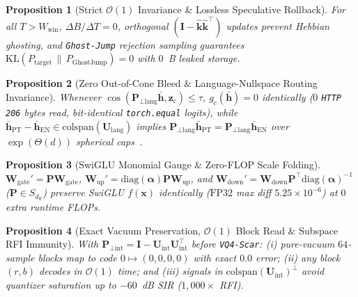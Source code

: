 \documentclass[10pt,twocolumn]{article}
\newtheorem{proposition}{Proposition}
\begin{document}
\begin{proposition}[Strict $\mathcal{O}(1)$ Invariance \& Lossless Speculative Rollback]
\label{prop:scache_ghost}
For all $T > W_{\text{win}}$, $\Delta B / \Delta T = 0$, orthogonal $(\mathbf{I} - \hat{\mathbf{k}}\hat{\mathbf{k}}^\top)$ updates prevent Hebbian ghosting, and \texttt{Ghost-Jump} rejection sampling guarantees $\mathrm{KL}(P_{\text{target}} \,\|\, P_{\text{GhostJump}}) = 0$ with $0$~B leaked storage.
\end{proposition}

\begin{proposition}[Zero Out-of-Cone Bleed \& Language-Nullspace Routing Invariance]
\label{prop:scarstore}
Whenever $\cos(\mathbf{P}_{\perp\text{lang}}\bar{\mathbf{h}}, \mathbf{z}_c) \le \tau$, $g_c(\bar{\mathbf{h}}) = 0$ identically ($0$ \texttt{HTTP 206} bytes read, bit-identical \texttt{torch.equal} logits), while $\bar{\mathbf{h}}_{\text{PT}} - \bar{\mathbf{h}}_{\text{EN}} \in \mathrm{colspan}(\mathbf{U}_{\text{lang}})$ implies $\mathbf{P}_{\perp\text{lang}}\bar{\mathbf{h}}_{\text{PT}} = \mathbf{P}_{\perp\text{lang}}\bar{\mathbf{h}}_{\text{EN}}$ over $\exp(\Theta(d))$ spherical caps~\citep{kabatiansky1978bounds}.
\end{proposition}

\begin{proposition}[SwiGLU Monomial Gauge \& Zero-FLOP Scale Folding]
\label{prop:rebasin}
$\mathbf{W}_{\text{gate}}' = \mathbf{P}\mathbf{W}_{\text{gate}}$, $\mathbf{W}_{\text{up}}' = \mathrm{diag}(\boldsymbol{\alpha})\mathbf{P}\mathbf{W}_{\text{up}}$, and $\mathbf{W}_{\text{down}}' = \mathbf{W}_{\text{down}}\mathbf{P}^\top\mathrm{diag}(\boldsymbol{\alpha})^{-1}$ ($\mathbf{P} \in S_{d_{\text{ff}}}$) preserve SwiGLU $f(\mathbf{x})$ identically ($\mathrm{FP32}$ max diff $5.25 \times 10^{-6}$) at $0$ extra runtime FLOPs.
\end{proposition}

\begin{proposition}[Exact Vacuum Preservation, $\mathcal{O}(1)$ Block Read \& Subspace RFI Immunity]
\label{prop:vq4_pperp}
With $\mathbf{P}_{\perp\text{int}} = \mathbf{I} - \mathbf{U}_{\text{int}}\mathbf{U}_{\text{int}}^\top$ before \texttt{VQ4-Scar}: (i) pure-vacuum $64$-sample blocks map to code $0 \mapsto (0,0,0,0)$ with exact $0.0$ error; (ii) any block $(r,b)$ decodes in $\mathcal{O}(1)$ time; and (iii) signals in $\mathrm{colspan}(\mathbf{U}_{\text{int}})^\perp$ avoid quantizer saturation up to $-60$~dB SIR ($1{,}000\times$ RFI).
\end{proposition}
\end{document}
